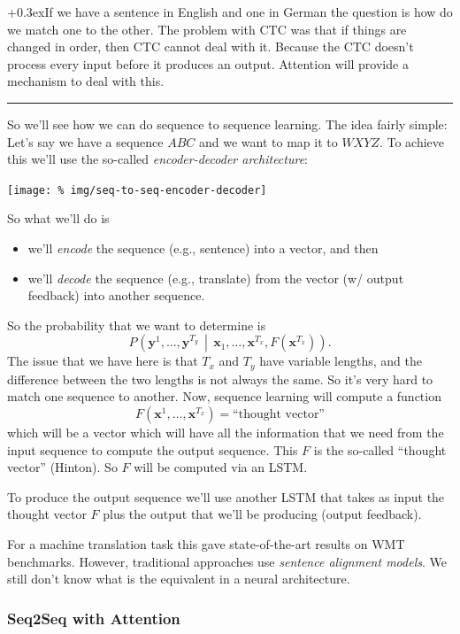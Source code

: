 \documentclass[a2paper,4pt]{extarticle}
\newcommand{\cProb}[3][]{P_{#1}\left( #2 \,\middle|\, #3 \right)}
\renewcommand{\vec}[1]{\mathbf{#1}}
\newcommand{\vx}{\vec{x}}
\newcommand{\vy}{\vec{y}}
\newcommand{\customboxpaddingsize}{0pt}
\newcommand{\emptyarg}[1][]{\ifthenelse{\isempty{#1}}{}{\ (#1)}}
\newcommand{\Ex}[1][]{{\setlength\fboxsep{\customboxpaddingsize}
\colorbox{excolor}{%
\color{custtitlecolor}{\textbf{Ex.\emptyarg[#1]}}}\kern+0.3ex}}
\newcommand{\sep}{\vspace{0pt}\noindent\hrule\vspace{0pt}}
\newcommand{\sep}{\vspace{5pt}\noindent\hrule\vspace{5pt}}
\begin{document}
\begin{landscape}
\begin{multicols*}{7}
\Ex If we have a sentence in English and one in German the question is how do we
match one to the other. The problem with CTC was that if things are changed in
order, then CTC cannot deal with it. Because the CTC doesn't process every input
before it produces an output. Attention will provide a mechanism to deal with
this.

\sep

So we'll see how we can do sequence to sequence learning. The idea fairly
simple: Let's say we have a sequence $ABC$ and we want to map it to $WXYZ$. To
achieve this we'll use the so-called \emph{encoder-decoder architecture}:

\begin{center}
  \texttt{[image: \%
img/seq-to-seq-encoder-decoder]}
\end{center}

So what we'll do is
\begin{itemize}
  \item we'll \emph{encode} the sequence (e.g., sentence) into a vector, and
  then
  \item we'll \emph{decode} the sequence (e.g., translate) from the vector (w/
  output feedback) into another sequence.
\end{itemize}

So the probability that we want to determine is
\[
\cProb{\vy^1,\ldots,\vy^{T_y}}{\vx_1,\ldots,\vx^{T_x},F(\vx^{T_x})}.
\]
The issue that we have here is that $T_x$ and $T_y$ have variable lengths, and
the difference between the two lengths is not always the same. So it's very hard
to match one sequence to another. Now, sequence learning will compute a function
\[
F(\vx^1,\ldots,\vx^{T_x}) = \text{``thought vector''}
\]
which will be a vector which will have all the information that we need from the
input sequence to compute the output sequence. This $F$ is the so-called
``thought vector'' (Hinton). So $F$ will be computed via an LSTM. 

To produce the output sequence we'll use another LSTM that takes as input the
thought vector $F$ plus the output that we'll be producing (output feedback).

For a machine translation task this gave state-of-the-art results on WMT
benchmarks. However, traditional approaches use \emph{sentence alignment
models}. We still don't know what is the equivalent in a neural architecture.

\subsubsection{Seq2Seq with Attention}


\end{multicols*}
\end{landscape}
\end{document}
